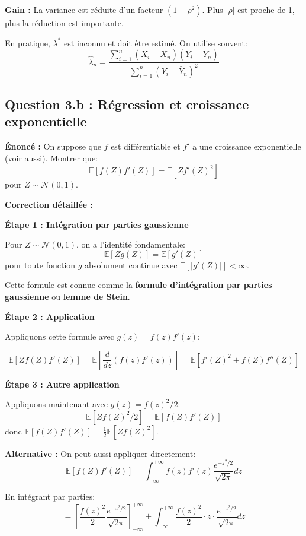 \documentclass[12pt,a4paper]{article}
\theoremstyle{definition}
\newcommand{\E}{\mathbb{E}}
\begin{document}
\textbf{Gain :} La variance est réduite d'un facteur $(1 - \rho^2)$. Plus $|\rho|$ est proche de 1, plus la réduction est importante.

\begin{astuce}
En pratique, $\lambda^*$ est inconnu et doit être estimé. On utilise souvent:
\[
\hat{\lambda}_n = \frac{\sum_{i=1}^n (X_i - \bar{X}_n)(Y_i - \bar{Y}_n)}{\sum_{i=1}^n (Y_i - \bar{Y}_n)^2}
\]
\end{astuce}

\subsection{Question 3.b : Régression et croissance exponentielle}

\textbf{Énoncé :} On suppose que $f$ est différentiable et $f'$ a une croissance exponentielle (voir aussi). Montrer que:
\[
\E[f(Z)f'(Z)] = \E[Zf'(Z)^2]
\]
pour $Z \sim \mathcal{N}(0,1)$.

\textbf{Correction détaillée :}

\textbf{Étape 1 : Intégration par parties gaussienne}

Pour $Z \sim \mathcal{N}(0,1)$, on a l'identité fondamentale:
\[
\E[Zg(Z)] = \E[g'(Z)]
\]
pour toute fonction $g$ absolument continue avec $\E[|g'(Z)|] < \infty$.

Cette formule est connue comme la \textbf{formule d'intégration par parties gaussienne} ou \textbf{lemme de Stein}.

\textbf{Étape 2 : Application}

Appliquons cette formule avec $g(z) = f(z)f'(z)$:

\[
\E[Z f(Z) f'(Z)] = \E\left[ \frac{d}{dz}(f(z)f'(z)) \right] = \E[f'(Z)^2 + f(Z)f''(Z)]
\]

\textbf{Étape 3 : Autre application}

Appliquons maintenant avec $g(z) = f(z)^2/2$:
\[
\E[Z f(Z)^2 / 2] = \E[f(Z)f'(Z)]
\]
donc $\E[f(Z)f'(Z)] = \frac{1}{2}\E[Zf(Z)^2]$.

\textbf{Alternative :} On peut aussi appliquer directement:
\[
\E[f(Z)f'(Z)] = \int_{-\infty}^{+\infty} f(z)f'(z) \frac{e^{-z^2/2}}{\sqrt{2\pi}} dz
\]

En intégrant par parties:
\[
= \left[ \frac{f(z)^2}{2} \frac{e^{-z^2/2}}{\sqrt{2\pi}} \right]_{-\infty}^{+\infty} + \int_{-\infty}^{+\infty} \frac{f(z)^2}{2} \cdot z \cdot \frac{e^{-z^2/2}}{\sqrt{2\pi}} dz
\]
\end{document}
